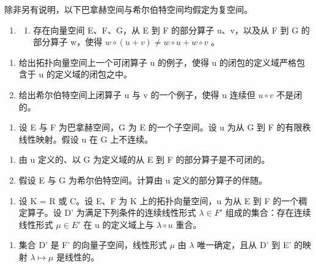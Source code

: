 \exercisesection{}

除非另有说明，以下巴拿赫空间与希尔伯特空间均假定为复空间。

\begin{enumerate}
\def\labelenumi{\arabic{enumi})}
\tightlist
\item
  \begin{enumerate}
  \def\labelenumii{\alph{enumii})}
  \tightlist
  \item
    存在向量空间 E、F、G，从 E 到 F 的部分算子 u、v，以及从 F 到 G 的部分算子 w，使得 \(w \circ (u + v) \neq w \circ u + w \circ v\) 。
  \end{enumerate}
\end{enumerate}

\begin{enumerate}
\def\labelenumi{\alph{enumi})}
\setcounter{enumi}{1}
\item
  给出拓扑向量空间上一个可闭算子 u 的例子，使得 u 的闭包的定义域严格包含于 u 的定义域的闭包之中。
\item
  给出希尔伯特空间上闭算子 u 与 v 的一个例子，使得 u 连续但 \(u \circ v\) 不是闭的。
\end{enumerate}

\begin{enumerate}
\def\labelenumi{\arabic{enumi})}
\setcounter{enumi}{1}
\tightlist
\item
  设 E 与 F 为巴拿赫空间，G 为 E 的一个子空间。设 u 为从 G 到 F 的有限秩线性映射。假设 u 在 G 上不连续。
\end{enumerate}

\begin{enumerate}
\def\labelenumi{\alph{enumi})}
\item
  由 u 定义的、以 G 为定义域的从 E 到 F 的部分算子是不可闭的。
\item
  假设 E 与 G 为希尔伯特空间。计算由 u 定义的部分算子的伴随。
\end{enumerate}

\begin{enumerate}
\def\labelenumi{\arabic{enumi})}
\setcounter{enumi}{2}
\tightlist
\item
  设 K = R 或 C。设 E、F 为 K 上的拓扑向量空间，u 为从 E 到 F 的一个稠定算子。设 D' 为满足下列条件的连续线性形式 \(\lambda \in F'\) 组成的集合：存在连续线性形式 \(\mu \in E'\) 在 u 的定义域上与 \(\lambda \circ u\) 重合。
\end{enumerate}

\begin{enumerate}
\def\labelenumi{\alph{enumi})}
\tightlist
\item
  集合 D' 是 F' 的向量子空间，线性形式 \(\mu\) 由 \(\lambda\) 唯一确定，且从 D' 到 E' 的映射 \(\lambda \mapsto \mu\) 是线性的。
\end{enumerate}

